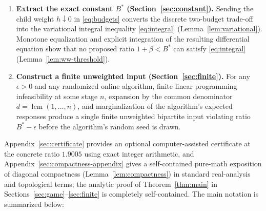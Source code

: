 \documentclass[11pt,letterpaper]{article}
\begin{document}
\begin{enumerate}
\item \textbf{Extract the exact constant $B^*$ (Section~\ref{sec:constant}).}
  Sending the child weight $h\downarrow 0$ in \eqref{eq:budgets} converts the discrete two-budget trade-off into the variational integral inequality \eqref{eq:integral} (Lemma~\ref{lem:variational}). Monotone equalization and explicit integration of the resulting differential equation show that no proposed ratio $1+\beta < B^*$ can satisfy \eqref{eq:integral} (Lemma~\ref{lem:ww-threshold}).

\item \textbf{Construct a finite unweighted input (Section~\ref{sec:finite}).}
  For any $\epsilon>0$ and any randomized online algorithm, finite linear programming infeasibility at some stage $n$, expansion by the common denominator $d=\operatorname{lcm}(1,\ldots,n)$, and marginalization of the algorithm's expected responses produce a single finite unweighted bipartite input violating ratio $B^*-\epsilon$ before the algorithm's random seed is drawn.
\end{enumerate}

Appendix~\ref{sec:certificate} provides an optional computer-assisted certificate at the concrete ratio $1.9005$ using exact integer arithmetic, and Appendix~\ref{sec:compactness-appendix} gives a self-contained pure-math exposition of diagonal compactness (Lemma~\ref{lem:compactness}) in standard real-analysis and topological terms; the analytic proof of Theorem~\ref{thm:main} in Sections~\ref{sec:game}--\ref{sec:finite} is completely self-contained. The main notation is summarized below:
\end{document}
